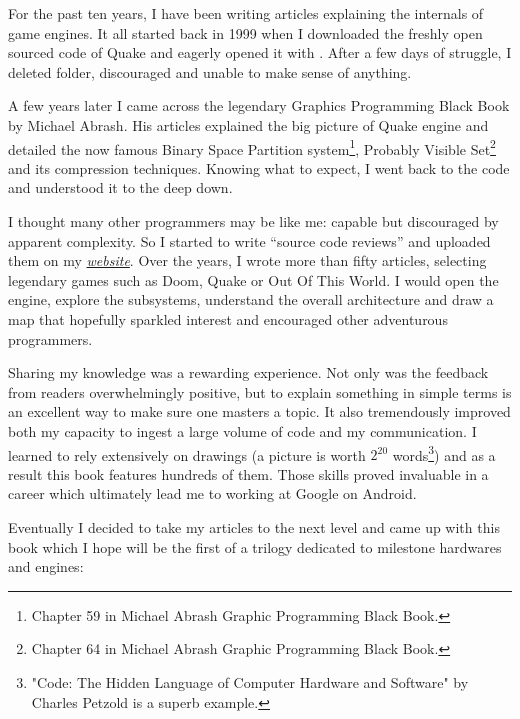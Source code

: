 \documentclass[book.tex]{subfiles}
\begin{document}
For the past ten years, I have been writing articles explaining the internals of game engines. It all started back in 1999 when I downloaded the freshly open sourced code of \mbox{Quake} and eagerly opened it with . After a few days of struggle, I deleted  folder, discouraged and unable to make sense of anything.

\bigskip

A few years later I came across the legendary Graphics Programming Black Book by Michael Abrash. His articles explained the big picture of Quake engine and detailed the now famous Binary Space Partition system\footnote{Chapter 59 in Michael Abrash Graphic Programming Black Book.}, Probably Visible Set\footnote{Chapter 64 in Michael Abrash Graphic Programming Black Book.} and its compression techniques. Knowing what to expect, I went back to the code and understood it to the deep down.

\bigskip

I thought many other programmers may be like me: capable but discouraged by apparent complexity. So I started to write ``source  code reviews'' and uploaded them on my
\href{http://fabiensanglard.net}{\textit{website}}. Over the years, I wrote more than fifty articles, selecting legendary games such as Doom, Quake or Out Of This World. I would open the engine, explore the subsystems, understand the overall architecture and draw a map that hopefully sparkled interest and encouraged other adventurous programmers.

\bigskip

Sharing my knowledge was a rewarding experience. Not only was the feedback from readers overwhelmingly positive, but to explain something in simple terms is an excellent way to make sure one masters a topic. It also tremendously improved both my capacity to ingest a large volume of code and my communication. I learned to rely extensively on drawings (a picture is worth $2^{20}$ words\footnote{"Code: The Hidden Language of Computer Hardware and Software" by Charles Petzold is a superb example.}) and as a result this book features hundreds of them. Those skills proved invaluable in a career which ultimately lead me to working at Google on Android.

\newpage

Eventually I decided to take my articles to the next level and came up with this book which I hope will be the first of a trilogy dedicated to milestone hardwares and engines:
\end{document}
